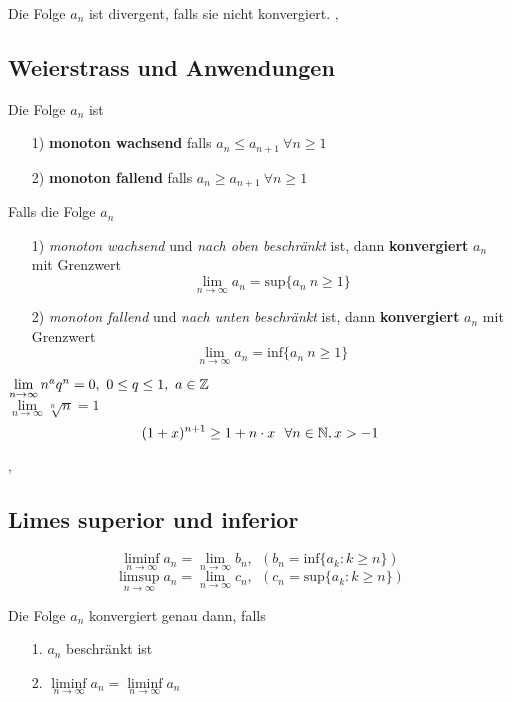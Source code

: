 Die Folge $a_{n}$ ist divergent, falls sie nicht konvergiert.
\sep

\subsection{Weierstrass und Anwendungen}

\Def[2.2.1] Die Folge $a_{n}$ ist
\begin{enumerate}
\item[1)] \textbf{monoton wachsend}  falls ${a_{n} \leq a_{n + 1} \ \forall n \geq 1}$
\item[2)] \textbf{monoton fallend} falls ${a_{n} \geq a_{n + 1} \ \forall n \geq 1}$
\end{enumerate}

\Satz[2.2.2 (Weierstrass)] Falls die Folge $a_{n}$ 
\begin{enumerate}
\item[1)] \textit{monoton wachsend} und \textit{nach oben beschränkt} ist, dann \textbf{konvergiert} $a_{n}$ mit Grenzwert
\[ 
\lim\limits_{n \rightarrow \infty} a_{n} = \text{sup}\{a_{n} \: n \geq 1\}
\]
\item[2)] \textit{monoton fallend} und \textit{nach unten beschränkt} ist, dann \textbf{konvergiert} $a_{n}$ mit Grenzwert
\[ 
\lim\limits_{n \rightarrow \infty} a_{n} = \text{inf}\{a_{n} \: n \geq 1\}
\]
\end{enumerate}
\Bsp[2.2.3] $\lim\limits_{n \rightarrow \infty} n^{a}q^{n} = 0, \ 0 \leq q \leq 1, \ a \in \mathbb{Z}$ \\
\Bsp[2.2.5] $\lim\limits_{n \rightarrow \infty} \sqrt[n]{n} = 1$ \\
\[
(1 + x)^{n+1} \geq 1 + n \cdot x \ \ \forall n \in \N, x > -1
\] 

\sep

\subsection{Limes superior und inferior}

\Def[2.3.0]
\[
\liminf\limits_{n \rightarrow \infty} a_{n} = \lim\limits_{n \rightarrow \infty} b_{n}, \ \ (b_{n} = \text{inf} \{a_{k} : k \geq n \})
\]
\[
\limsup\limits_{n \rightarrow \infty} a_{n} = \lim\limits_{n \rightarrow \infty} c_{n}, \ \ (c_{n} = \text{sup} \{a_{k} : k \geq n \})
\]

\Lemma[2.4.1] Die Folge $a_{n}$ konvergiert genau dann, falls
\begin{enumerate}
\item[1.] $a_{n}$ beschränkt ist
\item[2.] $\liminf\limits_{n \rightarrow \infty} a_{n} = \liminf\limits_{n \rightarrow \infty} a_{n}$
\end{enumerate}

